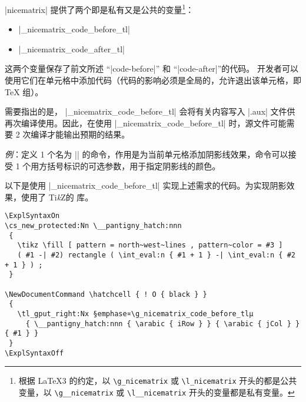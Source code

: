 \documentclass[dvipsnames]{article}%
\def\tikzname{Ti\emph{k}Z}
\begin{document}
|nicematrix| 提供了两个即是私有又是公共的变量\footnote{根据 LaTeX3 的约定，以 \texttt{\textbackslash g\_nicematrix} 或 \texttt{\textbackslash l\_nicematrix} 开头的都是公共变量，以 \texttt{\textbackslash g\_\_nicematrix} 或 \texttt{\textbackslash l\_\_nicematrix} 开头的变量都是私有变量。}：
\begin{itemize}
\item |\g_nicematrix_code_before_tl|
\item |\g_nicematrix_code_after_tl|
\end{itemize}


\medskip
这两个变量保存了前文所述 “|code-before|” 和 “|code-after|”的代码。
开发者可以使用它们在单元格中添加代码（代码的影响必须是全局的，允许退出该单元格，即 TeX 组）。

\medskip
需要指出的是， |\g_nicematrix_code_before_tl| 会将有关内容写入 |.aux| 文件供再次编译使用。因此，在使用 |\g_nicematrix_code_before_tl| 时，源文件可能需要 2 次编译才能输出预期的结果。

\bigskip
\emph{例}：定义 1 个名为 |\hatchcell| 的命令，作用是为当前单元格添加阴影线效果，命令可以接受 1 个用方括号标识的可选参数，用于指定阴影线的颜色。

以下是使用 |\g_nicematrix_code_before_tl| 实现上述需求的代码。为实现阴影效果，使用了 \tikzname 的  库。


\begin{scope}
\begin{Verbatim}
\ExplSyntaxOn
\cs_new_protected:Nn \__pantigny_hatch:nnn
 {
   \tikz \fill [ pattern = north~west~lines , pattern~color = #3 ]
   ( #1 -| #2) rectangle ( \int_eval:n { #1 + 1 } -| \int_eval:n { #2 + 1 } ) ;
 }

\NewDocumentCommand \hatchcell { ! O { black } }
 {
   \tl_gput_right:Nx §emphase¤\g_nicematrix_code_before_tlμ
     { \__pantigny_hatch:nnn { \arabic { iRow } } { \arabic { jCol } } { #1 } }
 }
\ExplSyntaxOff
\end{Verbatim}
\end{scope}
\end{document}
